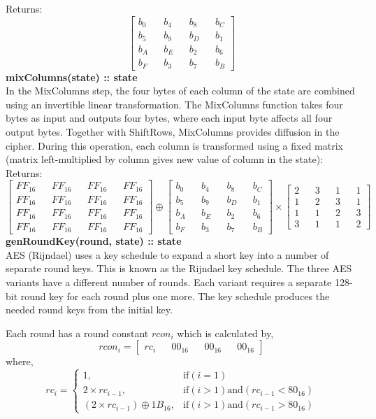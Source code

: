 Returns:
$$
\begin{bmatrix}
b_0 && b_4 && b_8 && b_C \\
b_5 && b_9 && b_D && b_1 \\
b_A && b_E && b_2 && b_6 \\
b_F && b_3 && b_7 && b_B
\end{bmatrix}
$$
\textbf{mixColumns(state) :: state} \\
In the MixColumns step, the four bytes of each column of the state are combined using an invertible linear transformation. The MixColumns function takes four bytes as input and outputs four bytes, where each input byte affects all four output bytes. Together with ShiftRows, MixColumns provides diffusion in the cipher. 
During this operation, each column is transformed using a fixed matrix (matrix left-multiplied by column gives new value of column in the state):
Returns:
$$
\begin{bmatrix}
FF_{16} && FF_{16} && FF_{16} && FF_{16} \\
FF_{16} && FF_{16} && FF_{16} && FF_{16} \\
FF_{16} && FF_{16} && FF_{16} && FF_{16} \\
FF_{16} && FF_{16} && FF_{16} && FF_{16}
\end{bmatrix}
\oplus
\begin{bmatrix}
b_0 && b_4 && b_8 && b_C \\
b_5 && b_9 && b_D && b_1 \\
b_A && b_E && b_2 && b_6 \\
b_F && b_3 && b_7 && b_B
\end{bmatrix}
\times
\begin{bmatrix}
2 && 3 && 1 && 1 \\
1 && 2 && 3 && 1 \\
1 && 1 && 2 && 3 \\
3 && 1 && 1 && 2
\end{bmatrix}
$$
\textbf{genRoundKey(round, state) :: state} \\
AES (Rijndael) uses a key schedule to expand a short key into a number of separate round keys. This is known as the Rijndael key schedule. The three AES variants have a different number of rounds. Each variant requires a separate 128-bit round key for each round plus one more. The key schedule produces the needed round keys from the initial key.

Each round has a round constant $ rcon_i $ which is calculated by,
$$
rcon_i =
\begin{bmatrix}
rc_i && 00_{16} && 00_{16} && 00_{16}
\end{bmatrix}
$$
where,
$$
rc_i =
\begin{cases}
1, & \text{if} (i = 1) \\
2 \times rc_{i-1}, & \text{if} (i > 1) \text{and} (rc_{i-1} < 80_{16}) \\
(2 \times rc_{i-1}) \oplus 1B_{16}, & \text{if} (i > 1) \text{and} (rc_{i-1} > 80_{16}) 
\end{cases}
$$

